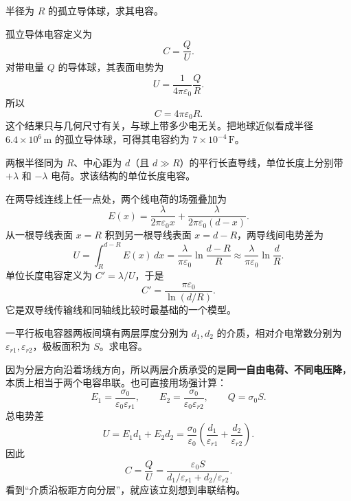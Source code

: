 \documentclass[lang=cn,11pt]{elegantbook}
\begin{document}
\begin{example}[球形孤立导体的电容]
半径为 \(R\) 的孤立导体球，求其电容。
\end{example}

\begin{solution}
孤立导体电容定义为
\[
C=\frac{Q}{U}.
\]
对带电量 \(Q\) 的导体球，其表面电势为
\[
U=\frac{1}{4\pi\varepsilon_0}\frac{Q}{R}.
\]
所以
\[
\boxed{C=4\pi\varepsilon_0R}.
\]
这个结果只与几何尺寸有关，与球上带多少电无关。把地球近似看成半径 \(6.4\times 10^6\,\mathrm{m}\) 的孤立导体球，可得其电容约为 \(7\times 10^{-4}\,\mathrm{F}\)。
\end{solution}

\begin{example}[两根平行长直导线的单位长度电容]
两根半径同为 \(R\)、中心距为 \(d\)（且 \(d\gg R\)）的平行长直导线，单位长度上分别带 \(+\lambda\) 和 \(-\lambda\) 电荷。求该结构的单位长度电容。
\end{example}

\begin{solution}
在两导线连线上任一点处，两个线电荷的场强叠加为
\[
E(x)=\frac{\lambda}{2\pi\varepsilon_0 x}
+\frac{\lambda}{2\pi\varepsilon_0(d-x)}.
\]
从一根导线表面 \(x=R\) 积到另一根导线表面 \(x=d-R\)，两导线间电势差为
\[
U=\int_R^{d-R}E(x)\,dx
=\frac{\lambda}{\pi\varepsilon_0}\ln\frac{d-R}{R}
\approx \frac{\lambda}{\pi\varepsilon_0}\ln\frac{d}{R}.
\]
单位长度电容定义为 \(C'=\lambda/U\)，于是
\[
\boxed{
C'=\frac{\pi\varepsilon_0}{\ln(d/R)}
}.
\]
它是双导线传输线和同轴线比较时最基础的一个模型。
\end{solution}

\begin{example}[沿场方向分层的平行板电容器]
一平行板电容器两板间填有两层厚度分别为 \(d_1,d_2\) 的介质，相对介电常数分别为 \(\varepsilon_{r1},\varepsilon_{r2}\)，极板面积为 \(S\)。求电容。
\end{example}

\begin{solution}
因为分层方向沿着场线方向，所以两层介质承受的是\textbf{同一自由电荷、不同电压降}，本质上相当于两个电容串联。也可直接用场强计算：
\[
E_1=\frac{\sigma_0}{\varepsilon_0\varepsilon_{r1}},
\qquad
E_2=\frac{\sigma_0}{\varepsilon_0\varepsilon_{r2}},
\qquad
Q=\sigma_0S.
\]
总电势差
\[
U=E_1d_1+E_2d_2
=\frac{\sigma_0}{\varepsilon_0}\left(\frac{d_1}{\varepsilon_{r1}}+\frac{d_2}{\varepsilon_{r2}}\right).
\]
因此
\[
\boxed{
C=\frac{Q}{U}
=\frac{\varepsilon_0S}{d_1/\varepsilon_{r1}+d_2/\varepsilon_{r2}}
}.
\]
看到“介质沿板距方向分层”，就应该立刻想到串联结构。
\end{solution}
\end{document}
